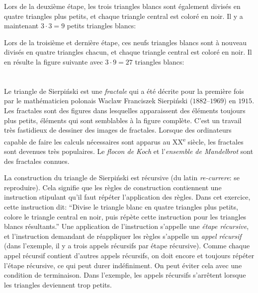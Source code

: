 {{{\centering%
\par}

Lors de la deuxième étape, les trois triangles blancs sont également divisés en quatre triangles plus petits, et chaque triangle central est coloré en noir. Il y a maintenant ${3 \cdot 3 = 9}$ petits triangles blancs:

{\centering%
\par}

Lors de la troisième et dernière étape, ces neufs triangles blancs sont à nouveau divisés en quatre triangles chacun, et chaque triangle central est coloré en noir. Il en résulte la figure suivante avec  ${3 \cdot 9 = 27}$ triangles blancs:

{\centering%
\par}



\section*{\BrochureItsInformatics}
Le triangle de Sierpiński est une \emph{fractale} qui a été décrite pour la première fois par le mathématicien polonais Waclaw Franciszek Sierpiński ($1882$–$1969$) en $1915$. Les fractales sont des figures dans lesquelles apparaissent des éléments toujours plus petits, éléments qui sont semblables à la figure complète. C’est un travail très fastidieux de dessiner des images de fractales. Lorsque des ordinateurs capable de faire les calculs nécessaires sont apparus au XX\textsuperscript{e} siècle, les fractales sont devenues très populaires. Le \emph{flocon de Koch} et l’\emph{ensemble de Mandelbrot} sont des fractales connues.

La construction du triangle de Sierpiński est récursive (du latin \emph{re-currere}: se reproduire). Cela signifie que les règles de construction contiennent une instruction stipulant qu’il faut répéter l’application des règles. Dans cet exercice, cette instruction dit: “Divise le triangle blanc en quatre triangles plus petits, colore le triangle central en noir, puis répète cette instruction pour les triangles blancs résultants.” Une application de l’instruction s’appelle une \emph{étape récursive}, et l’instruction demandant de réappliquer les règles s’appelle un \emph{appel récursif} (dans l’exemple, il y a trois appels récursifs par étape récursive). Comme chaque appel récursif contient d’autres appels récursifs, on doit encore et toujours répéter l’étape récursive, ce qui peut durer indéfiniment. On peut éviter cela avec une condition de terminaison. Dans l’exemple, les appels récursifs s’arrêtent lorsque les triangles deviennent trop petits.

}}
